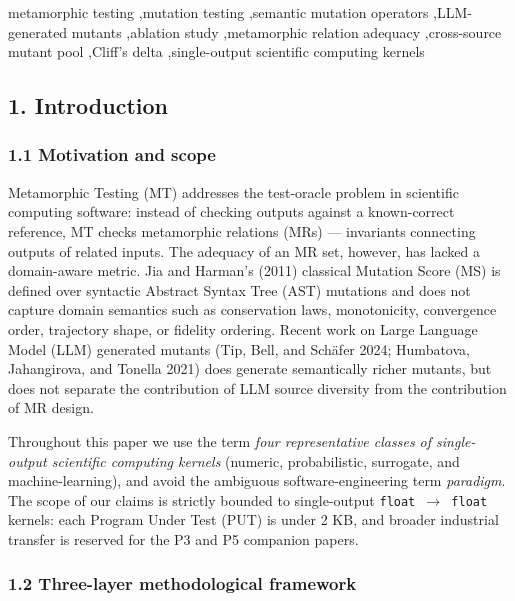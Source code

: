 \documentclass[review,12pt,authoryear]{elsarticle}
\begin{document}
\begin{frontmatter}
\begin{keyword}
metamorphic testing \sep mutation testing \sep semantic mutation operators \sep LLM-generated mutants \sep ablation study \sep metamorphic relation adequacy \sep cross-source mutant pool \sep Cliff's delta \sep single-output scientific computing kernels
\end{keyword}

\end{frontmatter}

\subsection{1. Introduction}\label{introduction}

\subsubsection{1.1 Motivation and scope}\label{motivation-and-scope}

Metamorphic Testing (MT) addresses the test-oracle problem in scientific
computing software: instead of checking outputs against a known-correct
reference, MT checks metamorphic relations (MRs) --- invariants
connecting outputs of related inputs. The adequacy of an MR set,
however, has lacked a domain-aware metric. Jia and Harman's (2011)
classical Mutation Score (MS) is defined over syntactic Abstract Syntax
Tree (AST) mutations and does not capture domain semantics such as
conservation laws, monotonicity, convergence order, trajectory shape, or
fidelity ordering. Recent work on Large Language Model (LLM) generated
mutants (Tip, Bell, and Schäfer 2024; Humbatova, Jahangirova, and
Tonella 2021) does generate semantically richer mutants, but does not
separate the contribution of LLM source diversity from the contribution
of MR design.

Throughout this paper we use the term \emph{four representative classes
of single-output scientific computing kernels} (numeric, probabilistic,
surrogate, and machine-learning), and avoid the ambiguous
software-engineering term \emph{paradigm}. The scope of our claims is
strictly bounded to single-output \texttt{float\ $\to$\ float} kernels: each
Program Under Test (PUT) is under 2 KB, and broader industrial transfer
is reserved for the P3 and P5 companion papers.

\subsubsection{1.2 Three-layer methodological
framework}\label{three-layer-methodological-framework}
\end{document}
